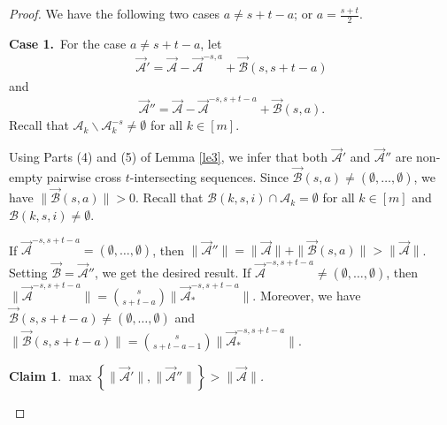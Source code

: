 \documentclass[11pt,a4paper]{article}
\newtheorem{claim}{Claim}
\begin{document}
\begin{proof}
We have the following two cases $a\neq s+t-a$; or $a=\frac{s+t}{2}$.

{\bf Case 1.}~For the case $a\neq s+t-a$, let 
\begin{align*}
 \vec{\mathcal{A}}' = \vec{\mathcal{A}}- \vec{\mathcal{A}}^{-s,a}+\vec{\mathcal{B}}(s,s+t-a)
\end{align*}
and 
\[ \vec{\mathcal{A}}'' =\vec{\mathcal{A}}- \vec{\mathcal{A}}^{-s,s+t-a}+\vec{\mathcal{B}}(s,a). \]
Recall that $\mathcal{A}_k\backslash \mathcal{A}_k^{-s}\neq \emptyset$ for all $k\in [m]$. 


Using Parts (4) and (5) of Lemma \ref{le3}, we infer that both $ \vec{\mathcal{A}}'$  and $ \vec{\mathcal{A}}''$ are  
non-empty pairwise cross $t$-intersecting sequences.
Since $\vec{\mathcal{B}}(s,a)\neq (\emptyset,\ldots, \emptyset)$, we have $\|\vec{\mathcal{B}}(s,a)\|>0$. Recall that $\mathcal{B}(k,s, i)\cap \mathcal{A}_{k}=\emptyset$ for all $k\in[m]$ and $\mathcal{B}(k,s, i)\neq \emptyset$.

If $\vec{\mathcal{A}}^{-s,s+t-a}= (\emptyset,\ldots, \emptyset)$, then $\|\vec{\mathcal{A}}''\|=\|\vec{\mathcal{A}}\|+\|\vec{\mathcal{B}}(s,a)\|>\|\vec{\mathcal{A}}\|$. Setting $\vec{\mathcal{B}}=\vec{\mathcal{A}}''$, we get the { desired result.}   
If $\vec{\mathcal{A}}^{-s,s+t-a}\neq (\emptyset,\ldots, \emptyset)$, then $\|\vec{\mathcal{A}}^{-s,s+t-a}\|
=\binom{s}{s+t-a}\|\vec{\mathcal{A}}_*^{-s,s+t-a}\|$.
Moreover, we have $\vec{\mathcal{B}}(s,s+t-a)\neq (\emptyset,\ldots, \emptyset)$ and $\|\vec{\mathcal{B}}(s,s+t-a)\|=\binom{s}{s+t-a-1}\|\vec{\mathcal{A}}_*^{-s,s+t-a}\|$.
\begin{claim}\label{cl1}
$\max \left\{\|\vec{\mathcal{A}}'\|, \|\vec{\mathcal{A}}''\|\right\}>\|\vec{\mathcal{A}}\|$.
\end{claim}


\end{proof}
\end{document}
